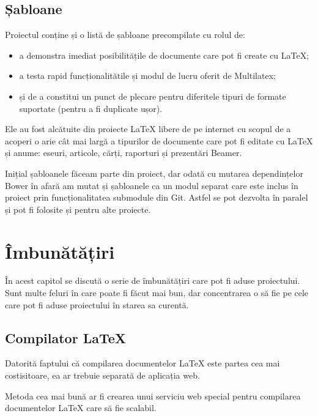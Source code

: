 \documentclass[a4wide,12pt]{report}
\begin{document}
\section{Șabloane}
\label{sabloanesec}

Proiectul conține și o listă de șabloane precompilate cu rolul de:

\begin{itemize}

\item a demonstra imediat posibilitățile de documente care pot fi create cu
\LaTeX{};

\item a testa rapid funcționalitătile și modul de lucru oferit de Multilatex;

\item și de a constitui un punct de plecare pentru diferitele tipuri de formate
suportate (pentru a fi duplicate ușor).

\end{itemize}

Ele au fost alcătuite din proiecte \LaTeX{} libere de pe internet cu scopul de a
acoperi o arie cât mai largă a tipurilor de documente care pot fi editate cu
\LaTeX{} și anume: eseuri, articole, cărți, raporturi și prezentări Beamer.

Inițial șabloanele făceam parte din proiect, dar odată cu mutarea dependințelor
Bower în afară am mutat și șabloanele ca un modul separat care este inclus în
proiect prin funcționalitatea submodule din Git. Astfel se pot dezvolta în
paralel și pot fi folosite și pentru alte proiecte.

\chapter{Îmbunătățiri}

În acest capitol se discută o serie de îmbunătățiri care pot fi aduse proiectului.
Sunt multe feluri în care poate fi făcut mai bun, dar concentrarea o să fie pe
cele care pot fi aduse proiectului în starea sa curentă.

\section{Compilator \LaTeX}
\label{comlatsec}

Datorită faptului că compilarea documentelor \LaTeX{} este partea cea mai
costisitoare, ea ar trebuie separată de aplicația web.

Metoda cea mai bună ar fi crearea unui serviciu web special pentru compilarea
documentelor \LaTeX{} care să fie scalabil.
\end{document}
